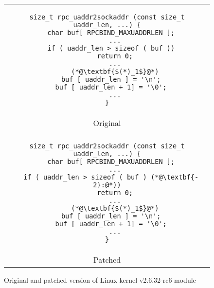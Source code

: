 \begin{figure}
\centering
\begin{tabular}{c}
\begin{lstlisting}
size_t rpc_uaddr2sockaddr (const size_t uaddr_len, ...) {
  char buf[ RPCBIND_MAXUADDRLEN ];
    ...
  if ( uaddr_len > sizeof ( buf ))
    return 0;
    ...
    (*@\textbf{$(*)_1$}@*)
  buf [ uaddr_len ] = '\n';
  buf [ uaddr_len + 1] = '\0';
    ...
}
\end{lstlisting}
\\
Original
\\
\hline
\\
\begin{lstlisting}
size_t rpc_uaddr2sockaddr (const size_t uaddr_len, ...) {
  char buf[ RPCBIND_MAXUADDRLEN ];
    ...
  if ( uaddr_len > sizeof ( buf ) (*@\textbf{- 2}:@*))
    return 0;
    ...
    (*@\textbf{$(*)_1$}@*)
  buf [ uaddr_len ] = '\n';
  buf [ uaddr_len + 1] = '\0';
    ...
}
\end{lstlisting}
\\
Patched
\end{tabular}
\caption{Original and patched version of Linux kernel  v2.6.32-rc6 module}
\end{figure}